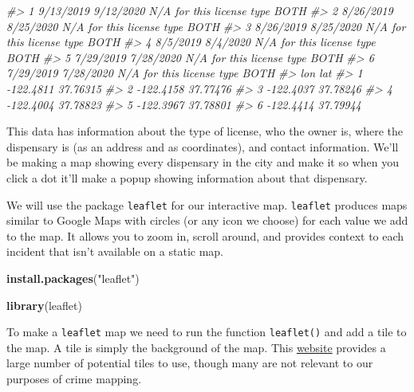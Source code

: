 \documentclass[
  12pt,
]{book}
\newenvironment{Shaded}{\begin{snugshade}}{\end{snugshade}}
\newcommand{\CommentTok}[1]{\textcolor[rgb]{0.37,0.37,0.37}{\textit{#1}}}
\newcommand{\KeywordTok}[1]{\textcolor[rgb]{0.27,0.27,0.27}{\textbf{#1}}}
\newcommand{\NormalTok}[1]{#1}
\newcommand{\StringTok}[1]{\textcolor[rgb]{0.5,0.5,0.5}{#1}}
\begin{document}
\begin{Shaded}
\begin{Highlighting}[]
\CommentTok{\#> 1  9/13/2019       9/12/2020 N/A for this license type                BOTH}
\CommentTok{\#> 2  8/26/2019       8/25/2020 N/A for this license type                BOTH}
\CommentTok{\#> 3  8/26/2019       8/25/2020 N/A for this license type                BOTH}
\CommentTok{\#> 4   8/5/2019        8/4/2020 N/A for this license type                BOTH}
\CommentTok{\#> 5  7/29/2019       7/28/2020 N/A for this license type                BOTH}
\CommentTok{\#> 6  7/29/2019       7/28/2020 N/A for this license type                BOTH}
\CommentTok{\#>         lon      lat}
\CommentTok{\#> 1 {-}122.4811 37.76315}
\CommentTok{\#> 2 {-}122.4158 37.77476}
\CommentTok{\#> 3 {-}122.4037 37.78246}
\CommentTok{\#> 4 {-}122.4004 37.78823}
\CommentTok{\#> 5 {-}122.3967 37.78801}
\CommentTok{\#> 6 {-}122.4414 37.79944}
\end{Highlighting}
\end{Shaded}

This data has information about the type of license, who the owner is, where the dispensary is (as an address and as coordinates), and contact information. We'll be making a map showing every dispensary in the city and make it so when you click a dot it'll make a popup showing information about that dispensary.

We will use the package \texttt{leaflet} for our interactive map. \texttt{leaflet} produces maps similar to Google Maps with circles (or any icon we choose) for each value we add to the map. It allows you to zoom in, scroll around, and provides context to each incident that isn't available on a static map.

\begin{Shaded}
\begin{Highlighting}[]
\KeywordTok{install.packages}\NormalTok{(}\StringTok{"leaflet"}\NormalTok{)}
\end{Highlighting}
\end{Shaded}

\begin{Shaded}
\begin{Highlighting}[]
\KeywordTok{library}\NormalTok{(leaflet)}
\end{Highlighting}
\end{Shaded}

To make a \texttt{leaflet} map we need to run the function \texttt{leaflet()} and add a tile to the map. A tile is simply the background of the map. This \href{https://leaflet-extras.github.io/leaflet-providers/preview/}{website} provides a large number of potential tiles to use, though many are not relevant to our purposes of crime mapping.
\end{document}
